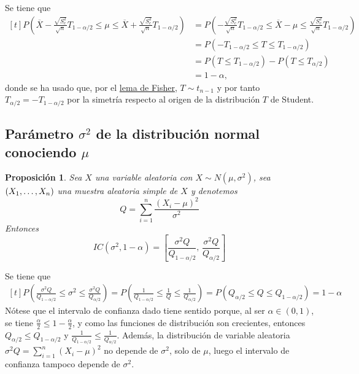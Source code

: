 \documentclass[11pt]{report}
\makeatletter
\renewenvironment{proof}[1][\proofname]{\par
  \pushQED{\qed}%
  \normalfont \topsep\z@skip %
  \trivlist
  \item[\hskip\labelsep
        \itshape
    #1\@addpunct{.}]\ignorespaces
}{%
  \popQED\endtrivlist\@endpefalse
}
\newtheorem{proposition}{Proposición}
\theoremstyle{definition}
\newcommand{\pars}[1]{\left( #1 \right)}
\makeatother
\begin{document}
\begin{proof}
Se tiene que
\[
\begin{aligned}[t]
P\pars{\overline{X}-\frac{\sqrt{S^2_c}}{\sqrt{n}}T_{1-\alpha/2} \leq \mu \leq \overline{X}+\frac{\sqrt{S^2_c}}{\sqrt{n}}T_{1-\alpha/2}} &=P\left(-\frac{\sqrt{S^2_c}}{\sqrt{n}}T_{1-\alpha/2} \leq \overline{X}-\mu \leq \frac{\sqrt{S^2_c}}{\sqrt{n}}T_{1-\alpha/2}\right) \\ 
&= P\pars{-T_{1-\alpha/2}\leq T \leq T_{1-\alpha/2}}\\
&= P(T \leq T_{1-\alpha/2})-P(T \leq T_{\alpha/2}) \\
&= 1-\alpha,
\end{aligned}
\]
donde se ha usado que, por el \hyperref[prop20]{\color{blue}lema de Fisher}, $T \sim t_{n-1}$ y por tanto $T_{\alpha/2} = -T_{1-\alpha/2}$ por la simetría respecto al origen de la distribución $T$ de Student. 
\end{proof}

\subsection{Parámetro \texorpdfstring{$\sigma^2$}{TEXT} de la distribución normal conociendo \texorpdfstring{$\mu$}{TEXT}}

\begin{proposition}
Sea $X$ una variable aleatoria con $X \sim N(\mu,\sigma^2)$, sea $(X_1,\mathellipsis,X_n)$ una muestra aleatoria simple de $X$ y denotemos
\[Q = \sum_{i=1}^n\frac{(X_i-\mu)^2}{\sigma^2}\]
Entonces
\[IC(\sigma^2,1-\alpha) = \left[\frac{\sigma^2Q}{Q_{1-\alpha/2}}, \, \frac{\sigma^2Q}{Q_{\alpha/2}}\right]\]
\end{proposition}

\begin{proof}
Se tiene que
\[
\begin{aligned}[t]
P\pars{\frac{\sigma^2Q}{Q_{1-\alpha/2}} \leq \sigma^2 \leq \frac{\sigma^2Q}{Q_{\alpha/2}}} = P\pars{\frac{1}{Q_{1-\alpha/2}} \leq \frac{1}{Q} \leq \frac{1}{Q_{\alpha/2}}} = P\pars{Q_{\alpha/2} \leq Q 
\leq Q_{1-\alpha/2}} = 1-\alpha
\end{aligned}
\]
Nótese que el intervalo de confianza dado tiene sentido porque, al ser $\alpha \in (0,1)$, se tiene $\frac{\alpha}{2} \leq 1-\frac{\alpha}{2}$, y como las funciones de distribución son crecientes, entonces $Q_{\alpha/2} \leq Q_{1-\alpha/2}$ y $\frac{1}{Q_{1-\alpha/2}} \leq \frac{1}{Q_{\alpha/2}}$.
Además, la distribución de variable aleatoria $\sigma^2 Q = \sum_{i=1}^n (X_i-\mu)^2$ no depende de $\sigma^2$, solo de $\mu$, luego el intervalo de confianza tampoco depende de $\sigma^2$.
\end{proof}
\end{document}
